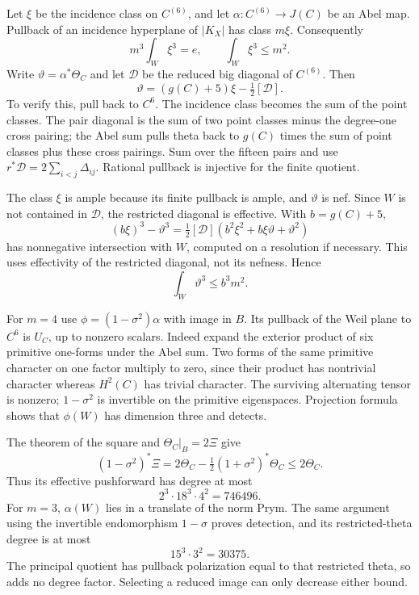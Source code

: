 Let $\xi$ be the incidence class on $C^{(6)}$, and let $\alpha:C^{(6)}\to J(C)$ be an Abel map. Pullback of an incidence hyperplane of $|K_X|$ has class $m\xi$. Consequently
\begin{equation}\label{eq:cyclic-incidence}
 m^3\int_W\xi^3=e,\qquad \int_W\xi^3\le m^2.
\end{equation}
Write $\vartheta=\alpha^*\Theta_C$ and let $\mathcal D$ be the reduced big diagonal of $C^{(6)}$. Then
\begin{equation}\label{eq:symmetric-theta}
 \vartheta=(g(C)+5)\xi-\tfrac12[\mathcal D].
\end{equation}
To verify this, pull back to $C^6$. The incidence class becomes the sum of the point classes. The pair diagonal is the sum of two point classes minus the degree-one cross pairing; the Abel sum pulls theta back to $g(C)$ times the sum of point classes plus these cross pairings. Sum over the fifteen pairs and use $r^*\mathcal D=2\sum_{i<j}\Delta_{ij}$. Rational pullback is injective for the finite quotient.

The class $\xi$ is ample because its finite pullback is ample, and $\vartheta$ is nef. Since $W$ is not contained in $\mathcal D$, the restricted diagonal is effective. With $b=g(C)+5$,
\[
 (b\xi)^3-\vartheta^3
 =\tfrac12[\mathcal D](b^2\xi^2+b\xi\vartheta+\vartheta^2)
\]
has nonnegative intersection with $W$, computed on a resolution if necessary. This uses effectivity of the restricted diagonal, not its nefness. Hence
\begin{equation}\label{eq:cyclic-theta-degree}
 \int_W\vartheta^3\le b^3m^2.
\end{equation}

For $m=4$ use $\phi=(1-\sigma^2)\alpha$ with image in $B$. Its pullback of the Weil plane to $C^6$ is $U_C$, up to nonzero scalars. Indeed expand the exterior product of six primitive one-forms under the Abel sum. Two forms of the same primitive character on one factor multiply to zero, since their product has nontrivial character whereas $H^2(C)$ has trivial character. The surviving alternating tensor is nonzero; $1-\sigma^2$ is invertible on the primitive eigenspaces. Projection formula shows that $\phi(W)$ has dimension three and detects.

The theorem of the square and $\Theta_C|_B=2\Xi$ give
\[
 (1-\sigma^2)^*\Xi
 =2\Theta_C-\tfrac12(1+\sigma^2)^*\Theta_C
 \le2\Theta_C.
\]
Thus its effective pushforward has degree at most
\[
 2^3\cdot18^3\cdot4^2=746496.
\]
For $m=3$, $\alpha(W)$ lies in a translate of the norm Prym. The same argument using the invertible endomorphism $1-\sigma$ proves detection, and its restricted-theta degree is at most
\[
 15^3\cdot3^2=30375.
\]
The principal quotient has pullback polarization equal to that restricted theta, so adds no degree factor. Selecting a reduced image can only decrease either bound.

